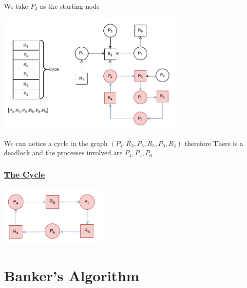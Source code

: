 \vspace{1.5cm}
\begin{center}
We take \(P_4\) as the starting node 
\end{center}

\begin{center}
    \includegraphics[width=0.7\textwidth]{Chapters/DFS/ex1.2.drawio.pdf}
\end{center}

\vspace{0.25cm}
\begin{center}
 We can notice a cycle in the graph \((P_4,R_3,P_5,R_5,P_6,R_4)\) therefore
There is a deadlock and the processes involved are \(P_4,P_5,P_6\)  
\end{center}

\vspace{1.5cm}
\begin{center}
    \subsubsection*{\underline{\Large{The Cycle}}}
\end{center}

\begin{center}
    \includegraphics[width=0.4\textwidth]{Chapters/DFS/cycle.pdf}
\end{center}


\section{Banker's Algorithm}

